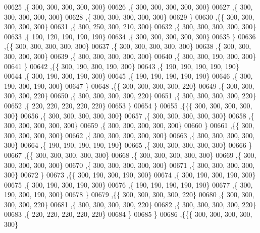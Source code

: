 \begin{DoxyCode}
00625    ,\{   300,   300,   300,   300,   300\}
00626    ,\{   300,   300,   300,   300,   300\}
00627    ,\{   300,   300,   300,   300,   300\}
00628    ,\{   300,   300,   300,   300,   300\}
00629    \}
00630   ,\{\{   300,   300,   300,   300,   300\}
00631    ,\{   300,   250,   300,   210,   300\}
00632    ,\{   300,   300,   300,   300,   300\}
00633    ,\{   190,   120,   190,   190,   190\}
00634    ,\{   300,   300,   300,   300,   300\}
00635    \}
00636   ,\{\{   300,   300,   300,   300,   300\}
00637    ,\{   300,   300,   300,   300,   300\}
00638    ,\{   300,   300,   300,   300,   300\}
00639    ,\{   300,   300,   300,   300,   300\}
00640    ,\{   300,   300,   190,   300,   300\}
00641    \}
00642   ,\{\{   300,   190,   300,   190,   300\}
00643    ,\{   190,   190,   190,   190,   190\}
00644    ,\{   300,   190,   300,   190,   300\}
00645    ,\{   190,   190,   190,   190,   190\}
00646    ,\{   300,   190,   300,   190,   300\}
00647    \}
00648   ,\{\{   300,   300,   300,   300,   220\}
00649    ,\{   300,   300,   300,   300,   220\}
00650    ,\{   300,   300,   300,   300,   220\}
00651    ,\{   300,   300,   300,   300,   220\}
00652    ,\{   220,   220,   220,   220,   220\}
00653    \}
00654   \}
00655  ,\{\{\{   300,   300,   300,   300,   300\}
00656    ,\{   300,   300,   300,   300,   300\}
00657    ,\{   300,   300,   300,   300,   300\}
00658    ,\{   300,   300,   300,   300,   300\}
00659    ,\{   300,   300,   300,   300,   300\}
00660    \}
00661   ,\{\{   300,   300,   300,   300,   300\}
00662    ,\{   300,   300,   300,   300,   300\}
00663    ,\{   300,   300,   300,   300,   300\}
00664    ,\{   190,   190,   190,   190,   190\}
00665    ,\{   300,   300,   300,   300,   300\}
00666    \}
00667   ,\{\{   300,   300,   300,   300,   300\}
00668    ,\{   300,   300,   300,   300,   300\}
00669    ,\{   300,   300,   300,   300,   300\}
00670    ,\{   300,   300,   300,   300,   300\}
00671    ,\{   300,   300,   300,   300,   300\}
00672    \}
00673   ,\{\{   300,   190,   300,   190,   300\}
00674    ,\{   300,   190,   300,   190,   300\}
00675    ,\{   300,   190,   300,   190,   300\}
00676    ,\{   190,   190,   190,   190,   190\}
00677    ,\{   300,   190,   300,   190,   300\}
00678    \}
00679   ,\{\{   300,   300,   300,   300,   220\}
00680    ,\{   300,   300,   300,   300,   220\}
00681    ,\{   300,   300,   300,   300,   220\}
00682    ,\{   300,   300,   300,   300,   220\}
00683    ,\{   220,   220,   220,   220,   220\}
00684    \}
00685   \}
00686  ,\{\{\{   300,   300,   300,   300,   300\}

\end{DoxyCode}
